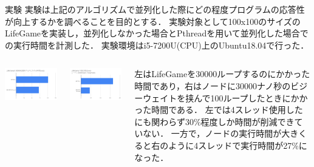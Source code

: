 \documentclass[dvipdfmx,final,t,12pt]{beamer}
\begin{document}
\begin{frame}[fragile]
    \begin{block}{実験}
        \vskip 0.2cm
            実験は上記のアルゴリズムで並列化した際にどの程度プログラムの応答性が向上するかを調べることを目的とする．
            実験対象として100x100のサイズのLifeGameを実装し，並列化しなかった場合とPthreadを用いて並列化した場合での実行時間を計測した．
            実験環境はi5-7200U(CPU)上のUbuntu18.04で行った．
        \begin{columns}
            \begin{column}{0.25\textwidth}
                \includegraphics[scale=0.23]{image/graph1.png}
            \end{column}
            \begin{column}{0.25\textwidth}
                \includegraphics[scale=0.23]{image/graph2.png}
            \end{column}
            \begin{column}{0.4\textwidth}
                \vskip -3.2cm
                左はLifeGameを30000ループするのにかかった時間であり，右はノードに30000ナノ秒のビジーウェイトを挟んで100ループしたときにかかった時間である．
                左では4スレッド使用したにも関わらず30\%程度しか時間が削減できていない．
                一方で，ノードの実行時間が大きくると右のように4スレッドで実行時間が27\%になった．
            \end{column}
        \end{columns}
    \end{block}
\end{frame}
\end{document}
